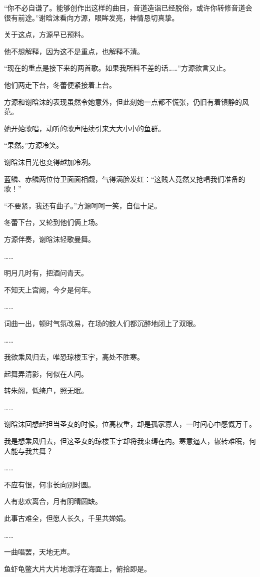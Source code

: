 \begin{this_body}
“你不必自谦了。能够创作出这样的曲目，音道造诣已经脱俗，或许你转修音道会很有前途。”谢晗沫看向方源，眼眸发亮，神情恳切真挚。

关于这点，方源早已预料。

他不想解释，因为这不是重点，也解释不清。

“现在的重点是接下来的两首歌。如果我所料不差的话……”方源欲言又止。

他们两走下台，冬蕾便紧接着上台。

方源和谢晗沫的表现虽然令她意外，但此刻她一点都不慌张，仍旧有着镇静的风范。

她开始歌唱，动听的歌声陆续引来大大小小的鱼群。

“果然。”方源冷笑。

谢晗沫目光也变得越加冷冽。

蓝鳞、赤鳞两位侍卫面面相觑，气得满脸发红：“这贱人竟然又抢唱我们准备的歌！”

“不要紧，我还有曲子。”方源呵呵一笑，自信十足。

冬蕾下台，又轮到他们俩上场。

方源伴奏，谢晗沫轻歌曼舞。

……

明月几时有，把酒问青天。

不知天上宫阙，今夕是何年。

……

词曲一出，顿时气氛改易，在场的鲛人们都沉醉地闭上了双眼。

……

我欲乘风归去，唯恐琼楼玉宇，高处不胜寒。

起舞弄清影，何似在人间。

转朱阁，低绮户，照无眠。

……

谢晗沫回想起担当圣女的时候，位高权重，却是孤家寡人，一时间心中感慨万千。

我是想乘风归去，但这圣女的琼楼玉宇却将我束缚在内。寒意逼人，辗转难眠，何人能与我共舞？

……

不应有恨，何事长向别时圆。

人有悲欢离合，月有阴晴圆缺。

此事古难全，但愿人长久，千里共婵娟。

……

一曲唱罢，天地无声。

鱼虾龟鳖大片大片地漂浮在海面上，俯拾即是。


\end{this_body}
